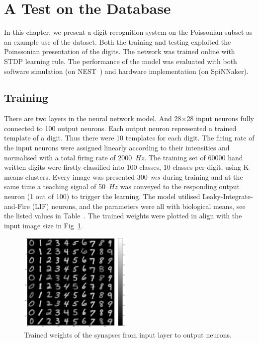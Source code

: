 \section{A Test on the Database}
\label{sec:test}
In this chapter, we present a digit recognition system on the Poissonian subset as an example use of the dataset.
Both the training and testing exploited the Poinssonian presentation of the digits.
The network was trained online with STDP learning rule.
The performance of the model was evaluated with both software simulation (on NEST~\cite{gewaltig2007nest}) and hardware implementation (on SpiNNaker). 
\subsection{Training}
There are two layers in the neural network model.
And 28$\times$28 input neurons fully connected to 100 output neurons.
Each output neuron represented a trained template of a digit.
Thus there were 10 templates for each digit.
The firing rate of the input neurons were assigned linearly according to their intensities and normalised with a total firing rate of 2000~$Hz$.
The training set of 60000 hand written digits were firstly classified into 100 classes, 10 classes per digit, using K-means clusters.
Every image was presented 300~$ms$ during training and at the same time a teaching signal of 50~$Hz$ was conveyed to the responding output neuron (1 out of 100) to trigger the learning.
The model utilised Leaky-Integrate-and-Fire (LIF) neurons, and the parameters were all with biological means, see the listed values in Table~.
The trained weights were plotted in align with the input image size in Fig~\ref{Fig:weight}.
\begin{figure}[hbt!]
	\centering
	\includegraphics[width=0.48\textwidth]{images/weight.png}
	\caption{Trained weights of the synapses from input layer to output neurons.}
	\label{Fig:weight}
\end{figure}  
 
